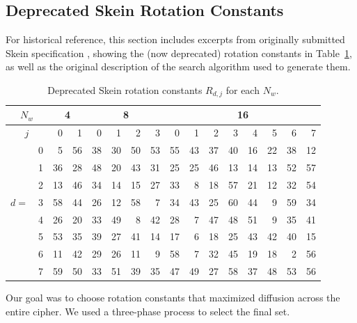 \documentclass[11pt,twoside]{article}
\begin{document}
\subsection{Deprecated Skein Rotation Constants}\label{sec:deprecatedrotconst}

For historical reference, this section includes excerpts from originally submitted Skein specification \cite{Skein1}, showing the (now deprecated) rotation constants in Table~\ref{tab:rotations_v1_0}, as well as the original description of the search algorithm used to generate them. 

\begin{table}[htbp]
  \begin{center}
    \begin{tabular}{|cc|rr|rrrr|rrrrrrrr|}
    \hline
    \multicolumn{2}{|c|}{$N_w$}&\multicolumn{2}{c|}{4}&\multicolumn{4}{c|}{8}&\multicolumn{8}{c|}{16}\\
    \hline
    \multicolumn{2}{|c|}{$j$}& 0 & 1 & 0 & 1 & 2 & 3 & 0 & 1 & 2 & 3 & 4 & 5 & 6 & 7\\
    \hline
    \hline
            & 0 &   5 & 56 &   38 & 30 & 50 & 53 &   55 & 43 & 37 & 40 & 16 & 22 & 38 & 12  \\
            & 1 &  36 & 28 &   48 & 20 & 43 & 31 &   25 & 25 & 46 & 13 & 14 & 13 & 52 & 57  \\
            & 2 &  13 & 46 &   34 & 14 & 15 & 27 &   33 &  8 & 18 & 57 & 21 & 12 & 32 & 54  \\
    $d =$   & 3 &  58 & 44 &   26 & 12 & 58 &  7 &   34 & 43 & 25 & 60 & 44 &  9 & 59 & 34  \\
            & 4 &  26 & 20 &   33 & 49 &  8 & 42 &   28 &  7 & 47 & 48 & 51 &  9 & 35 & 41  \\
            & 5 &  53 & 35 &   39 & 27 & 41 & 14 &   17 &  6 & 18 & 25 & 43 & 42 & 40 & 15  \\
            & 6 &  11 & 42 &   29 & 26 & 11 &  9 &   58 &  7 & 32 & 45 & 19 & 18 &  2 & 56  \\
            & 7 &  59 & 50 &   33 & 51 & 39 & 35 &   47 & 49 & 27 & 58 & 37 & 48 & 53 & 56  \\
       \hline
    \end{tabular}
  \end{center}\caption{Deprecated Skein rotation constants $R_{d,j}$ for each $N_w$.}
  \label{tab:rotations_v1_0}
\end{table}

Our goal was to choose rotation constants that maximized diffusion across the entire cipher.  We used a three-phase process to select the final set.
\end{document}
